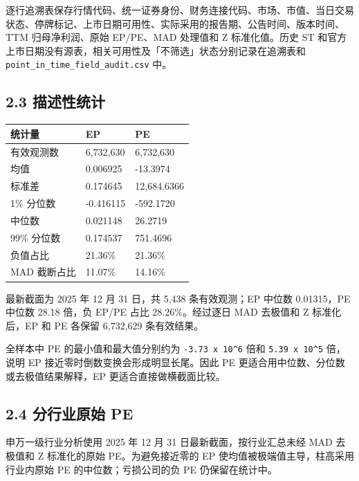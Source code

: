 \documentclass[UTF8,a4paper,11pt]{ctexart}
\begin{document}
逐行追溯表保存行情代码、统一证券身份、财务连接代码、市场、市值、当日交易状态、停牌标记、上市日期可用性、实际采用的报告期、公告时间、版本时间、TTM 归母净利润、原始 EP/PE、MAD 处理值和 Z 标准化值。历史 ST 和官方上市日期没有源表，相关可用性及「不筛选」状态分别记录在追溯表和 \texttt{point\_in\_time\_field\_audit.csv} 中。

{}
\subsection*{2.3 描述性统计}

\begin{table}[htbp]
\centering
\begin{tabularx}{\textwidth}{@{}YYY@{}}
\toprule
统计量 & EP & PE \\
\midrule
有效观测数 & 6,732,630 & 6,732,630 \\
均值 & 0.006925 & -13.3974 \\
标准差 & 0.174645 & 12,684.6366 \\
1\% 分位数 & -0.416115 & -592.1720 \\
中位数 & 0.021148 & 26.2719 \\
99\% 分位数 & 0.174537 & 751.4696 \\
负值占比 & 21.36\% & 21.36\% \\
MAD 截断占比 & 11.07\% & 14.16\% \\
\bottomrule
\end{tabularx}
\end{table}

最新截面为 2025 年 12 月 31 日，共 5,438 条有效观测；EP 中位数 0.01315，PE 中位数 28.18 倍，负 EP/PE 占比 28.26\%。经过逐日 MAD 去极值和 Z 标准化后，EP 和 PE 各保留 6,732,629 条有效结果。

全样本中 PE 的最小值和最大值分别约为 \texttt{-3.73 x 10\textasciicircum{}6} 倍和 \texttt{5.39 x 10\textasciicircum{}5} 倍，说明 EP 接近零时倒数变换会形成明显长尾。因此 PE 更适合用中位数、分位数或去极值结果解释，EP 更适合直接做横截面比较。

{}
\subsection*{2.4 分行业原始 PE}

申万一级行业分析使用 2025 年 12 月 31 日最新截面，按行业汇总未经 MAD 去极值和 Z 标准化的原始 PE。为避免接近零的 EP 使均值被极端值主导，柱高采用行业内原始 PE 的中位数；亏损公司的负 PE 仍保留在统计中。
\end{document}
